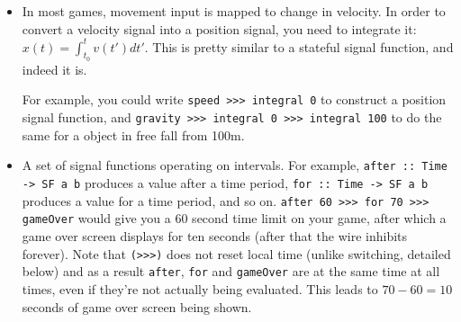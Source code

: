 \documentclass[pdftex,a4paper]{extarticle}
\begin{document}
\begin{itemize}
\item In most games, movement input is mapped to change in velocity. In order to convert a velocity signal into a position signal, you need to integrate it: $x(t) = \int_{t_0}^t v(t') dt'$. This is pretty similar to a stateful signal function, and indeed it is. 
\begin{figure}[ht]
\centering
{}
\end{figure}
For example, you could write \texttt{speed >>> integral 0} to construct a position signal function, and \texttt{gravity >>> integral 0 >>> integral 100} to do the same for a object in free fall from 100m.

\item A set of signal functions operating on intervals. For example, \texttt{after :: Time -> SF a b} produces a value after a time period, \texttt{for :: Time -> SF a b} produces a value for a time period, and so on. \texttt{after 60 >>> for 70 >>> gameOver} would give you a 60 second time limit on your game, after which a game over screen displays for ten seconds (after that the wire inhibits forever). Note that \texttt{(>>>)} does not reset local time (unlike switching, detailed below) and as a result \texttt{after}, \texttt{for} and \texttt{gameOver} are at the same time at all times, even if they're not actually being evaluated. This leads to $70 - 60 = 10$ seconds of game over screen being shown.


\end{itemize}
\end{document}

